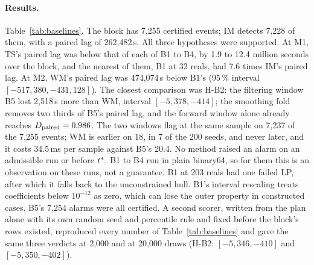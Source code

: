 \paragraph{Results.} Table~\ref{tab:baselines}. The block has 7,255 certified events; IM detects 7,228 of them, with a
paired lag of 262,482\,s. All three hypotheses were supported. At M1, TS's paired lag was below that of each of B1 to
B4, by 1.9 to 12.4 million seconds over the block, and the nearest of them, B1 at 32 reals, had 7.6 times IM's paired
lag. At M2, WM's paired lag was 474,074\,s below B1's (95\,\% interval $[-517{,}380, -431{,}128]$). The closest
comparison was H-B2: the filtering window B5 lost 2,518\,s more than WM, interval $[-5{,}378, -414]$; the smoothing
fold removes two thirds of B5's paired lag, and the forward window alone already reaches $D_{\mathrm{paired}} = 0.986$. The two
windows flag at the same sample on 7,237 of the 7,255 events; WM is earlier on 18, in 7 of the 200 seeds, and never
later, and it costs 34.5\,ms per sample against B5's 20.4. No method raised
an alarm on an admissible run or before $t^{\ast}$. B1 to B4 run in plain binary64, so for them this is an observation on
these runs, not a guarantee. B1 at 203 reals had one failed LP, after which it falls back to the unconstrained hull. B1's interval rescaling
treats coefficients below $10^{-12}$ as zero, which can lose the outer property in constructed cases. B5's
7,254 alarms were all certified. A second scorer, written from the plan alone with its own random seed and percentile
rule and fixed before the block's rows existed, reproduced every number of Table~\ref{tab:baselines} and gave the
same three verdicts at 2,000 and at 20,000 draws (H-B2: $[-5{,}346, -410]$ and $[-5{,}350, -402]$).

